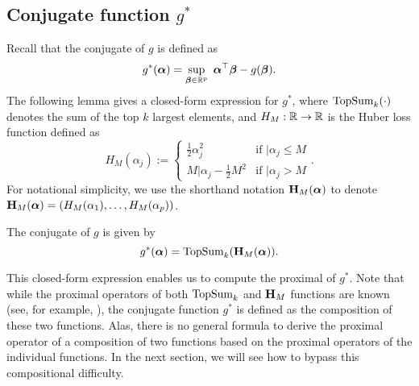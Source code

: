 \subsection{Conjugate function $g^*$}
Recall that the conjugate of $g$ is defined as
\begin{align*}
    g^*(\bm \alpha) = \sup_{\bm \beta \in \mathbb{R}^p} ~ \bm \alpha^\top \bm \beta - g(\bm \beta).
\end{align*}
The following lemma gives a closed-form expression for $g^*$, where $\operatorname{TopSum}_k(\cdot)$ denotes the sum of the top $k$ largest elements, and $H_M: \mathbb{R} \to \mathbb{R}$ is the Huber loss function defined as
\begin{equation}
    H_M(\alpha_j) := \begin{cases}
        \frac{1}{2} \alpha_j^2 & \text{if } \vert{\alpha_j} \leq M \\
        M \vert{\alpha_j} - \frac{1}{2} M^2 & \text{if } \vert{\alpha_j} > M
    \end{cases}.
\end{equation}
For notational simplicity, we use the shorthand notation ${\bf H}_M(\bm{\alpha})$ to denote ${\bf H}_M(\bm{\alpha}) = (H_M(\alpha_1), \dots, H_M(\alpha_p))$.

\begin{lemma}
    \label{lemma:fenchel_conjugate_of_g_closed_form_expression}
    The conjugate of $g$ is given by
    \begin{equation}
        g^*(\bm{\alpha}) = \operatorname{TopSum}_k({\bf H}_M(\bm{\alpha})).
    \end{equation}
\end{lemma}
This closed-form expression enables us to compute the proximal of $g^*$. Note that while the proximal operators of both $\operatorname{TopSum}_k$ and ${\bf H}_M$ functions are known (see, for example, \citep[Examples~6.50 \& 6.54]{beck2017first}), the conjugate function $g^*$ is defined as the composition of these two functions.
Alas, there is no general formula to derive the proximal operator of a composition of two functions based on the proximal operators of the individual functions. In the next section, we will see how to bypass this compositional difficulty.


